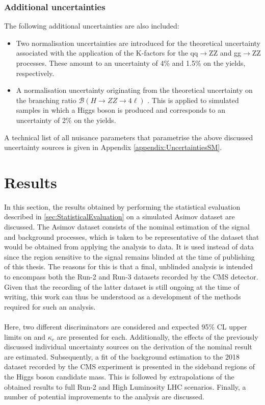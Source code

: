 \subsubsection{Additional uncertainties}
The following additional uncertainties are also included:
\begin{itemize}
    \item Two normalisation uncertainties are introduced for the theoretical uncertainty associated with the application of the K-factors for the qq$\rightarrow$ZZ and gg$\rightarrow$ZZ processes. These amount to an uncertainty of 4\% and 1.5\% on the yields, respectively.
    \item A normalisation uncertainty originating from the theoretical uncertainty on the branching ratio $\mathcal{B}(H\rightarrow ZZ\rightarrow 4\ell)$ \cite{HiggsHandBook}. This is applied to simulated samples in which a Higgs boson is produced and corresponds to an uncertainty of 2\% on the yields.  
\end{itemize}
A technical list of all nuisance parameters that parametrise the above discussed uncertainty sources is given in Appendix \autoref{appendix:UncertaintiesSM}.
\section{Results}
\label{sec:SMResult}
In this section, the results obtained by performing the statistical evaluation described in \autoref{sec:StatisticalEvaluation} on a simulated Asimov dataset \cite{Cowan_2011} are discussed. The Asimov dataset consists of the nominal estimation of the signal and background processes, which is taken to be representative of the dataset that would be obtained from applying the analysis to data. It is used instead of data since the region sensitive to the \cHZZsen signal remains blinded at the time of publishing of this thesis. The reasons for this is that a final, unblinded analysis is intended to encompass both the Run-2 and Run-3 datasets recorded by the CMS detector. Given that the recording of the latter dataset is still ongoing at the time of writing, this work can thus be understood as a development of the methods required for such an analysis. \\
\\
Here, two different discriminators are considered and expected 95\% CL upper limits on \sBR and $\kappa_c$ are presented for each. Additionally, the effects of the previously discussed individual uncertainty sources on the derivation of the nominal result are estimated. Subsequently, a fit of the background estimation to the 2018 dataset recorded by the CMS experiment is presented in the sideband regions of the Higgs boson candidate mass. This is followed by extrapolations of the obtained results to full Run-2 and High Luminosity LHC scenarios. Finally, a number of potential improvements to the analysis are discussed. \\
\\
